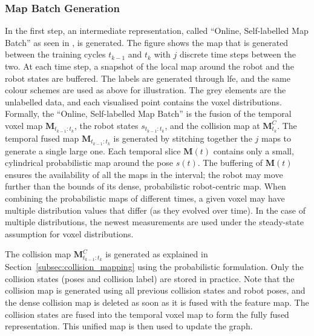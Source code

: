 \subsubsection{Map Batch Generation}
In the first step, an intermediate representation, called ``Online, Self-labelled Map Batch'' as seen in , is generated. The figure shows the map that is generated between the training cycles $t_{k-1}$ and $t_{k}$ with $j$ discrete time steps between the two. At each time step, a snapshot of the local map around the robot and the robot states are buffered. The labels are generated through \ac{lfe}, and the same colour schemes are used as above for illustration. The grey elements are the unlabelled data, and each visualised point contains the voxel distributions. Formally, the ``Online, Self-labelled Map Batch'' is the fusion of the temporal voxel map $\mathbf{M}_{t_{k-1}:t_{k}}$, the robot states $s_{t_{k-1}:t_k}$, and the collision map at $\mathbf{M}_{t_k}^C$. The temporal fused map $\mathbf{M}_{t_{k-1}:t_k}$ is generated by stitching together the $j$ maps to generate a single large one. Each temporal slice $\mathbf{M}(t)$ contains only a small, cylindrical probabilistic map around the pose $s(t)$. The buffering of $\mathbf{M}(t)$ ensures the availability of all the maps in the interval; the robot may move further than the bounds of its dense, probabilistic robot-centric map. When combining the probabilistic maps of different times, a given voxel may have multiple distribution values that differ (as they evolved over time). In the case of multiple distributions, the newest measurements are used under the steady-state assumption for voxel distributions. 

The collision map $\mathbf{M}_{t_{k-1}:t_k}^C$ is generated as explained in Section~\ref{subsec:collision_mapping} using the probabilistic formulation. Only the collision states (poses and collision label) are stored in practice. Note that the collision map is generated using all previous collision states and robot poses, and the dense collision map is deleted as soon as it is fused with the feature map. The collision states are fused into the temporal voxel map to form the fully fused representation. This unified map is then used to update the graph.

